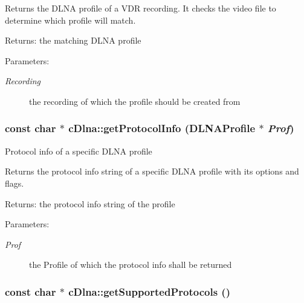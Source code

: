 Returns the DLNA profile of a VDR recording. It checks the video file to determine which profile will match.

\begin{Desc}
\item[Returns:]the matching DLNA profile \end{Desc}
\begin{Desc}
\item[Parameters:]
\begin{description}
\item[{\em Recording}]the recording of which the profile should be created from \end{description}
\end{Desc}
\hypertarget{classcDlna_992777f6c75dadd61bed6a75e03f1dfd}{
\subsubsection[{getProtocolInfo}]{\setlength{\rightskip}{0pt plus 5cm}const char $\ast$ cDlna::getProtocolInfo ({\bf DLNAProfile} $\ast$ {\em Prof})}}
\label{classcDlna_992777f6c75dadd61bed6a75e03f1dfd}


Protocol info of a specific DLNA profile

Returns the protocol info string of a specific DLNA profile with its options and flags.

\begin{Desc}
\item[Returns:]the protocol info string of the profile \end{Desc}
\begin{Desc}
\item[Parameters:]
\begin{description}
\item[{\em Prof}]the Profile of which the protocol info shall be returned \end{description}
\end{Desc}
\hypertarget{classcDlna_68a9565f022c7037c51ad337274d8c3a}{
\subsubsection[{getSupportedProtocols}]{\setlength{\rightskip}{0pt plus 5cm}const char $\ast$ cDlna::getSupportedProtocols ()}}
\label{classcDlna_68a9565f022c7037c51ad337274d8c3a}


